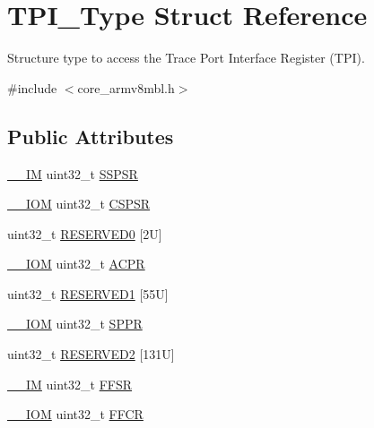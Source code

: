 \hypertarget{struct_t_p_i___type}{}\section{T\+P\+I\+\_\+\+Type Struct Reference}
\label{struct_t_p_i___type}


Structure type to access the Trace Port Interface Register (T\+PI).  




{\ttfamily \#include $<$core\+\_\+armv8mbl.\+h$>$}

\subsection*{Public Attributes}
\begin{DoxyCompactItemize}
\item 
\hyperlink{core__sc300_8h_a4cc1649793116d7c2d8afce7a4ffce43}{\+\_\+\+\_\+\+IM} uint32\+\_\+t \hyperlink{struct_t_p_i___type_a037901d7cb870199ac51d9ad0ef9fd1a}{S\+S\+P\+SR}
\item 
\hyperlink{core__sc300_8h_ab6caba5853a60a17e8e04499b52bf691}{\+\_\+\+\_\+\+I\+OM} uint32\+\_\+t \hyperlink{struct_t_p_i___type_a8826aa84e5806053395a742d38d59d0f}{C\+S\+P\+SR}
\item 
uint32\+\_\+t \hyperlink{struct_t_p_i___type_a409fb08ad6d58c17fcb7f59d65db6f93}{R\+E\+S\+E\+R\+V\+E\+D0} \mbox{[}2\+U\mbox{]}
\item 
\hyperlink{core__sc300_8h_ab6caba5853a60a17e8e04499b52bf691}{\+\_\+\+\_\+\+I\+OM} uint32\+\_\+t \hyperlink{struct_t_p_i___type_a9e5e4421ef9c3d5b7ff8b24abd4e99b3}{A\+C\+PR}
\item 
uint32\+\_\+t \hyperlink{struct_t_p_i___type_abc2f542560b78ccbbf0a44aadb5651fb}{R\+E\+S\+E\+R\+V\+E\+D1} \mbox{[}55\+U\mbox{]}
\item 
\hyperlink{core__sc300_8h_ab6caba5853a60a17e8e04499b52bf691}{\+\_\+\+\_\+\+I\+OM} uint32\+\_\+t \hyperlink{struct_t_p_i___type_a12f79d4e3ddc69893ba8bff890d04cc5}{S\+P\+PR}
\item 
uint32\+\_\+t \hyperlink{struct_t_p_i___type_ae6a238467f129df7440d97de8b58fe03}{R\+E\+S\+E\+R\+V\+E\+D2} \mbox{[}131\+U\mbox{]}
\item 
\hyperlink{core__sc300_8h_a4cc1649793116d7c2d8afce7a4ffce43}{\+\_\+\+\_\+\+IM} uint32\+\_\+t \hyperlink{struct_t_p_i___type_a6c47a0b4c7ffc66093ef993d36bb441c}{F\+F\+SR}
\item 
\hyperlink{core__sc300_8h_ab6caba5853a60a17e8e04499b52bf691}{\+\_\+\+\_\+\+I\+OM} uint32\+\_\+t \hyperlink{struct_t_p_i___type_a3f68b6e73561b4849ebf953a894df8d2}{F\+F\+CR}

\end{DoxyCompactItemize}
